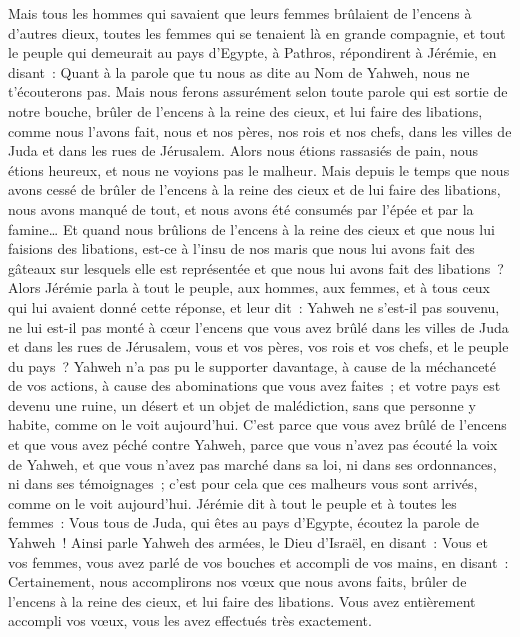 \begin{multicols}{2}
Mais tous les hommes qui savaient que leurs femmes brûlaient de l'encens à d'autres dieux, toutes les femmes qui se tenaient là en grande compagnie, et tout le peuple qui demeurait au pays d'Egypte, à Pathros, répondirent à Jérémie, en disant~:
Quant à la parole que tu nous as dite au Nom de Yahweh, nous ne t'écouterons pas.
Mais nous ferons assurément selon toute parole qui est sortie de notre bouche, brûler de l'encens à la reine des cieux, et lui faire des libations, comme nous l'avons fait, nous et nos pères, nos rois et nos chefs, dans les villes de Juda et dans les rues de Jérusalem. Alors nous étions rassasiés de pain, nous étions heureux, et nous ne voyions pas le malheur.
Mais depuis le temps que nous avons cessé de brûler de l'encens à la reine des cieux et de lui faire des libations, nous avons manqué de tout, et nous avons été consumés par l'épée et par la famine…
Et quand nous brûlions de l'encens à la reine des cieux et que nous lui faisions des libations, est-ce à l'insu de nos maris que nous lui avons fait des gâteaux sur lesquels elle est représentée et que nous lui avons fait des libations~?
Alors Jérémie parla à tout le peuple, aux hommes, aux femmes, et à tous ceux qui lui avaient donné cette réponse, et leur dit~:
Yahweh ne s'est-il pas souvenu, ne lui est-il pas monté à cœur l'encens que vous avez brûlé dans les villes de Juda et dans les rues de Jérusalem, vous et vos pères, vos rois et vos chefs, et le peuple du pays~?
Yahweh n'a pas pu le supporter davantage, à cause de la méchanceté de vos actions, à cause des abominations que vous avez faites~; et votre pays est devenu une ruine, un désert et un objet de malédiction, sans que personne y habite, comme on le voit aujourd'hui.
C'est parce que vous avez brûlé de l'encens et que vous avez péché contre Yahweh, parce que vous n'avez pas écouté la voix de Yahweh, et que vous n'avez pas marché dans sa loi, ni dans ses ordonnances, ni dans ses témoignages~; c'est pour cela que ces malheurs vous sont arrivés, comme on le voit aujourd'hui.
Jérémie dit à tout le peuple et à toutes les femmes~: Vous tous de Juda, qui êtes au pays d'Egypte, écoutez la parole de Yahweh~!
Ainsi parle Yahweh des armées, le Dieu d'Israël, en disant~: Vous et vos femmes, vous avez parlé de vos bouches et accompli de vos mains, en disant~: Certainement, nous accomplirons nos vœux que nous avons faits, brûler de l'encens à la reine des cieux, et lui faire des libations. Vous avez entièrement accompli vos vœux, vous les avez effectués très exactement.

\end{multicols}
